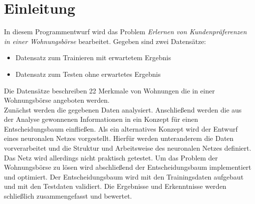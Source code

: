 \section{Einleitung}\label{sec:einleitung}
In diesem Programmentwurf wird das Problem \emph{Erlernen von Kundenpräferenzen in einer Wohnungsbörse}
bearbeitet. Gegeben sind zwei Datensätze: 
\begin{itemize}
    \item Datensatz zum Trainieren mit erwartetem Ergebnis
    \item Datensatz zum Testen ohne erwartetes Ergebnis
\end{itemize}

Die Datensätze beschreiben 22 Merkmale von Wohnungen die in einer Wohnungsbörse angeboten werden. \\
Zunächst werden die gegebenen Daten analysiert. Anschließend werden die aus der Analyse gewonnenen Informationen 
in ein Konzept für einen Entscheidungsbaum einfließen. 
Als ein alternatives Konzept wird der Entwurf eines neuronalen Netzes vorgestellt. Hierfür werden unteranderem
die Daten vorverarbeitet und die Struktur und Arbeitsweise des neuronalen Netzes definiert. Das Netz wird allerdings nicht praktisch getestet. 
Um das Problem der Wohnungsbörse zu lösen wird abschließend der Entscheidungsbaum implementiert und optimiert. 
Der Entscheidungsbaum wird mit den Trainingsdaten aufgebaut und mit den Testdaten validiert.
Die Ergebnisse und Erkenntnisse werden schließlich zusammengefasst und bewertet.